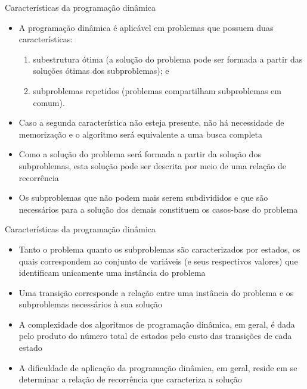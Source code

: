 \begin{frame}[fragile]{Características da programação dinâmica}

    \begin{itemize}
        \item A programação dinâmica é aplicável em problemas que possuem duas características:
        \pause

        \begin{enumerate}
            \item subestrutura ótima (a solução do problema pode ser formada a partir das soluções
                ótimas dos subproblemas); e
        \pause
            \item subproblemas repetidos (problemas compartilham subproblemas em comum).
        \end{enumerate}
        \pause

        \item Caso a segunda característica não esteja presente, não há necessidade de memorização
            e o algoritmo será equivalente a uma busca completa
        \pause

        \item Como a solução do problema será formada a partir da solução dos subproblemas, esta
            solução pode ser descrita por meio de uma relação de recorrência
        \pause

        \item Os subproblemas que não podem mais serem subdivididos e que são necessários para
            a solução dos demais constituem os casos-base do problema
    \end{itemize}

\end{frame}

\begin{frame}[fragile]{Características da programação dinâmica}

    \begin{itemize}
        \item Tanto o problema quanto os subproblemas são caracterizados por estados, os quais
            correspondem ao conjunto de variáveis (e seus respectivos valores) que identificam
            unicamente uma instância do problema
        \pause
        
        \item Uma transição corresponde a relação entre uma instância do problema e os 
            subproblemas necessários à sua solução
        \pause

        \item A complexidade dos algoritmos de programação dinâmica, em geral, é dada pelo
            produto do número total de estados pelo custo das transições de cada estado
        \pause

        \item A dificuldade de aplicação da programação dinâmica, em geral, reside em se determinar
            a relação de recorrência que caracteriza a solução
    \end{itemize}

\end{frame}

